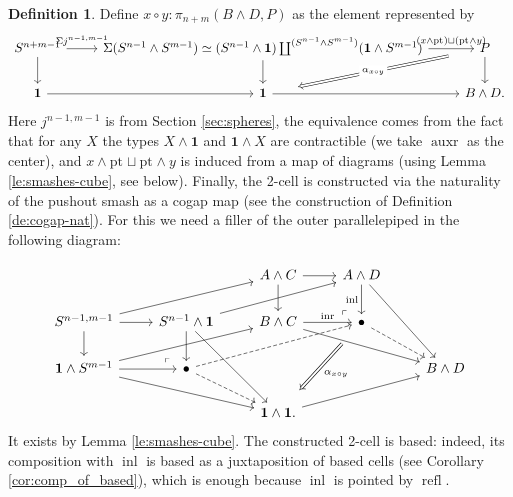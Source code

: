 \documentclass{amsart}
\theoremstyle{definition}
\newtheorem{de}[theorem]{Definition}
\newcommand{\refl}{\operatorname{refl}}
\newcommand{\inl}{\operatorname{inl}}
\newcommand{\inr}{\operatorname{inr}}
\newcommand{\auxr}{\operatorname{auxr}}
\newcommand{\bs}[1]{\mathrm{pt}_{#1}}
\newcommand{\sgtn}{\mathbf{1}}
\begin{document}
\begin{de}\label{de:circ}
    Define $x \circ y : \pi_{n+m}(B \wedge D, P)$ as the element represented by
\[\begin{tikzcd}
	{S^{n+m-1}} & {\Sigma (S^{n-1} \wedge S^{m-1}) \simeq (S^{n-1} \wedge \sgtn) \coprod^{(S^{n-1} \wedge S^{m-1})} (\sgtn \wedge S^{m-1})} & P \\
	\sgtn & \sgtn & {B \wedge D.}
	\arrow["{\Sigma j^{n-1,m-1}}", from=1-1, to=1-2]
	\arrow[from=1-1, to=2-1]
	\arrow["{(x \wedge \bs{}) \sqcup (\bs{} \wedge y)}", from=1-2, to=1-3]
	\arrow[from=1-2, to=2-2]
	\arrow["{\alpha_{x \circ y}}"{description}, shorten <=20pt, shorten >=20pt, Rightarrow, from=1-3, to=2-2]
	\arrow[from=1-3, to=2-3]
	\arrow[from=2-1, to=2-2]
	\arrow[from=2-2, to=2-3]
\end{tikzcd}\]
Here $j^{n-1, m-1}$ is from Section \ref{sec:spheres}, the equivalence comes from the fact that for any $X$ the types $X \wedge \sgtn$ and $\sgtn \wedge X$ are contractible (we take $\auxr$ as the center), and $x \wedge \bs{} \sqcup \bs{} \wedge y$ is induced from a map of diagrams (using Lemma \ref{le:smashes-cube}, see below). Finally, the 2-cell is constructed via the naturality of the pushout smash as a cogap map (see the construction of Definition \ref{de:cogap-nat}). For this we need a filler of the outer parallelepiped in the following diagram:

\[\begin{tikzcd}
	&& {A \wedge C} & {A \wedge D} \\
	{S^{n-1,m-1}} & {S^{n-1} \wedge \sgtn} & {B \wedge C} & \bullet \\
	{\sgtn \wedge S^{m-1}} & \bullet &&& {B \wedge D} \\
	&& {\sgtn \wedge \sgtn.}
	\arrow[from=1-3, to=1-4]
	\arrow[from=1-3, to=2-3]
	\arrow["\inl"', from=1-4, to=2-4]
	\arrow[from=1-4, to=3-5]
	\arrow[from=2-1, to=1-3]
	\arrow[from=2-1, to=2-2]
	\arrow[from=2-1, to=3-1]
	\arrow[from=2-2, to=1-4]
	\arrow[from=2-2, to=3-2]
	\arrow[from=2-2, to=4-3]
	\arrow["\inr", from=2-3, to=2-4]
	\arrow[from=2-3, to=3-5]
	\arrow["\lrcorner"{anchor=center, pos=0.125, rotate=180}, draw=none, from=2-4, to=1-3]
	\arrow[dashed, from=2-4, to=3-5]
	\arrow["{\alpha_{x \circ y}}", shorten <=12pt, shorten >=12pt, Rightarrow, from=2-4, to=4-3]
	\arrow[from=3-1, to=2-3]
	\arrow[from=3-1, to=3-2]
	\arrow[from=3-1, to=4-3]
	\arrow["\lrcorner"{anchor=center, pos=0.125, rotate=180}, draw=none, from=3-2, to=2-1]
	\arrow[dashed, from=3-2, to=2-4]
	\arrow[dashed, from=3-2, to=4-3]
	\arrow[from=4-3, to=3-5]
\end{tikzcd}\]
It exists by Lemma \ref{le:smashes-cube}. The constructed 2-cell is based: indeed, its composition with $\inl$ is based as a juxtaposition of based cells (see Corollary \ref{cor:comp_of_based}), which is enough because $\inl$ is pointed by $\refl$.
\end{de}
\end{document}
